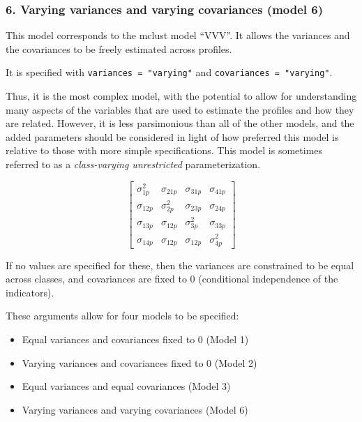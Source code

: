 \documentclass[man]{apa6}
\providecommand{\tightlist}{%
  \setlength{\itemsep}{0pt}\setlength{\parskip}{0pt}}
\begin{document}
\hypertarget{varying-variances-and-varying-covariances-model-6}{%
\subsubsection{6. Varying variances and varying covariances (model 6)}\label{varying-variances-and-varying-covariances-model-6}}

This model corresponds to the mclust model \enquote{VVV}. It allows the variances and the covariances to be freely estimated across profiles.

It is specified with \texttt{variances\ =\ "varying"} and \texttt{covariances\ =\ "varying"}.

Thus, it is the most complex model, with the potential to allow for understanding many aspects of the variables that are used to estimate the profiles and how they are related. However, it is less parsimonious than all of the other models, and the added parameters should be considered in light of how preferred this model is relative to those with more simple specifications. This model is sometimes referred to as a \emph{class-varying unrestricted} parameterization.

\[
\left[ \begin{matrix} { \sigma  }_{ 1p }^{ 2 } & { \sigma  }_{ 21p } & { \sigma  }_{ 31p } & { \sigma  }_{ 41p } \\ { \sigma  }_{ 12p } & { \sigma  }_{ 2p }^{ 2 } & { \sigma  }_{ 23p } & { \sigma  }_{ 24p } \\ { \sigma  }_{ 13p } & { \sigma  }_{ 12p } & { \sigma  }_{ 3p }^{ 2 } & { \sigma  }_{ 33p } \\ { \sigma  }_{ 14p } & { \sigma  }_{ 12p } & { \sigma  }_{ 12p } & { \sigma  }_{ 4p }^{ 2 } \end{matrix} \right] 
\]

If no values are specified for these, then the variances are constrained to be
equal across classes, and covariances are fixed to 0 (conditional independence
of the indicators).

These arguments allow for four models to be specified:

\begin{itemize}
\tightlist
\item
  Equal variances and covariances fixed to 0 (Model 1)
\item
  Varying variances and covariances fixed to 0 (Model 2)
\item
  Equal variances and equal covariances (Model 3)
\item
  Varying variances and varying covariances (Model 6)
\end{itemize}
\end{document}
